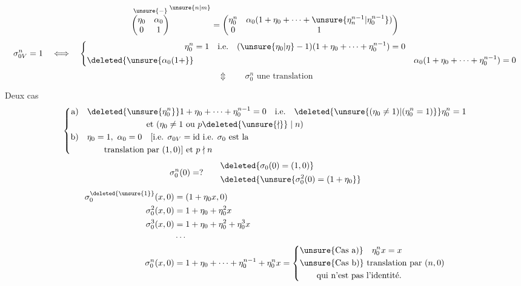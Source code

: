\[
\overset{\unsure{-}}{\begin{pmatrix}\eta_0&\alpha_0\\0&1\end{pmatrix}}^{\unsure{n|m}}
=\begin{pmatrix}\eta_0^n&\alpha_0(1+\eta_0+\cdots+\unsure{\eta_n^{n-1}|\eta_0^{n-1}})\\0&1\end{pmatrix}
\]
\[
\sigma_{0V}^n=1\quad\Longleftrightarrow\quad
\left\{\begin{aligned}
\eta_0^n&=1\quad\text{i.e.}\quad(\unsure{\eta_0|\eta}-1)(1+\eta_0+\cdots+\eta_0^{n-1})=0\\
\deleted{\unsure{\alpha_0(1+}}&&\alpha_0(1+\eta_0+\cdots+\eta_0^{n-1})=0
\end{aligned}\right.
\]
\[
\Updownarrow\qquad\sigma_0^n\text{ une translation}
\]

Deux cas
\[
\left\{\begin{aligned}
\text{a)}\quad&\deleted{\unsure{\eta_0^n}}1+\eta_0+\cdots+\eta_0^{n-1}=0\quad\text{i.e.}\quad
\deleted{\unsure{(\eta_0\ne1)|(\eta_0^n=1)}}\eta_0^n=1\\
&\hspace{7em}\text{et }(\eta_0\ne1\text{ ou }p\deleted{\unsure{\nmid}}\mid n)\\
\text{b)}\quad&\eta_0=1,\ \alpha_0=0\quad[\text{i.e. }\sigma_{0V}=\mathrm{id}\text{ i.e. }\sigma_0\text{ est la}\\
&\qquad\text{translation par }(1,0)]\text{ et }p\nmid n
\end{aligned}\right.
\]
\[
\sigma_0^n(0)=?\qquad
\begin{aligned}
&\deleted{\sigma_0(0)=(1,0)}\\
&\deleted{\unsure{\sigma_0^2(0)=(1+\eta_0}}
\end{aligned}
\]
\[
\begin{aligned}
\sigma_0^{\deleted{\unsure{1}}}(x,0)&=(1+\eta_0x,0)\\
\sigma_0^2(x,0)&=1+\eta_0+\eta_0^2x\\
\sigma_0^3(x,0)&=1+\eta_0+\eta_0^2+\eta_0^3x\\
&\cdots\\
\sigma_0^n(x,0)&=1+\eta_0+\cdots+\eta_0^{n-1}+\eta_0^n x
=\left\{\begin{aligned}
&\text{\unsure{Cas a)}}\quad\eta_0^n x=x\\
&\text{\unsure{Cas b)} translation par }(n,0)\\
&\qquad\text{qui n'est pas l'identité.}
\end{aligned}\right.
\end{aligned}
\]
